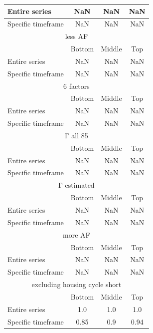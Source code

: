 \begin{table}[h!]
\begin{tabular}{|l|c|c|c|}
Entire series & NaN & NaN & NaN \\ \hline
Specific timeframe & NaN & NaN & NaN \\ \hline
\multicolumn{4}{|c|}{less AF} \\ \hline
& Bottom & Middle & Top \\ \hline
Entire series & NaN & NaN & NaN \\ \hline
Specific timeframe & NaN & NaN & NaN \\ \hline
\multicolumn{4}{|c|}{6 factors} \\ \hline
& Bottom & Middle & Top \\ \hline
Entire series & NaN & NaN & NaN \\ \hline
Specific timeframe & NaN & NaN & NaN \\ \hline
\multicolumn{4}{|c|}{Γ all 85} \\ \hline
& Bottom & Middle & Top \\ \hline
Entire series & NaN & NaN & NaN \\ \hline
Specific timeframe & NaN & NaN & NaN \\ \hline
\multicolumn{4}{|c|}{Γ estimated} \\ \hline
& Bottom & Middle & Top \\ \hline
Entire series & NaN & NaN & NaN \\ \hline
Specific timeframe & NaN & NaN & NaN \\ \hline
\multicolumn{4}{|c|}{more AF} \\ \hline
& Bottom & Middle & Top \\ \hline
Entire series & NaN & NaN & NaN \\ \hline
Specific timeframe & NaN & NaN & NaN \\ \hline
\multicolumn{4}{|c|}{excluding housing cycle short} \\ \hline
& Bottom & Middle & Top \\ \hline
Entire series & 1.0 & 1.0 & 1.0 \\ \hline
Specific timeframe & 0.85 & 0.9 & 0.94 \\ \hline
\end{tabular}
\end{table}
